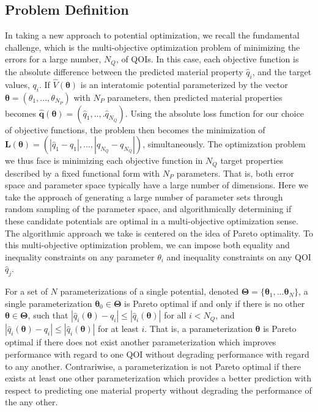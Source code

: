 \subsection{Problem Definition}

In taking a new approach to potential optimization, we recall the fundamental challenge, which is the multi-objective optimization problem of minimizing the errors for a large number, $N_Q$, of QOIs. In this case, each objective function is the absolute difference between the predicted material property $\hat{q}_i$, and the target values, $q_i$.  If  $\hat{V}(\bm{\theta})$ is an interatomic potential parameterized by the vector $\bm{\theta} = (\theta_1,...,\theta_{N_P})$ with $N_P$ parameters, then predicted material properties becomes $\hat{\bm{q}}(\bm{\theta}) = (\hat{q}_1,..,.\hat{q}_{N_Q})$.
Using the absolute loss function for our choice of objective functions, the problem then becomes the minimization of  $\bm{L}(\bm{\theta}) = (|\hat{q}_1-q_1|,...,|\hat{q}_{N_Q}-q_{N_Q}|)$, simultaneously.
The optimization problem we thus face is minimizing each objective function in $N_Q$ target properties described by a fixed functional form with $N_P$ parameters.  That is, both error space and parameter space typically have a large number of dimensions.  Here we take the approach of generating a large number of parameter sets through random sampling of the parameter space, and algorithmically determining if these candidate potentials are optimal in a multi-objective optimization sense.  The algorithmic approach we take is centered on the idea of Pareto optimality.  To this multi-objective optimization problem, we can impose both equality and inequality constraints on any parameter $\theta_i$ and inequality constraints on any QOI $\hat{q}_j$.

For a set of $N$ parameterizations of a single potential, denoted $\bm{\Theta}= \{\bm{\theta}_1,...\bm{\theta}_N\}$, a single parameterization $\bm{\theta}_0 \in \bm{\Theta}$ is Pareto optimal if and only if there is no other $\bm{\theta} \in \bm{\Theta}$, such that $|\hat{q}_i(\bm{\theta})-q_i| \leq |\hat{q}_i(\bm{\theta})|$
for all $i<N_Q$, and $|\hat{q}_i(\bm{\theta})-q_i| \leq |\hat{q}_i(\bm{\theta})|$ for at least $i$.  That is, a parameterization $\bm{\theta}$ is Pareto optimal if there does not exist another parameterization which improves performance with regard to one QOI without degrading performance with regard to any another.  Contrariwise, a parameterization is not Pareto optimal if there exists at least one other parameterization which provides a better prediction with respect to predicting one material property without degrading the performance of the any other.

